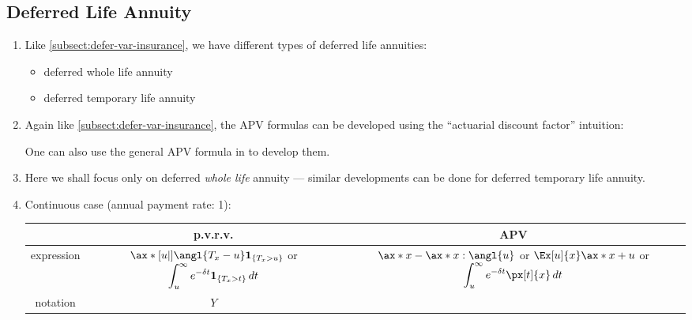 \subsection{Deferred Life Annuity}
\begin{enumerate}
\item Like \cref{subsect:defer-var-insurance}, we have different types of deferred life annuities:
\begin{itemize}
\item deferred whole life annuity
\item deferred temporary life annuity
\end{itemize}
\item Again like \cref{subsect:defer-var-insurance}, the APV formulas can be
developed using the ``actuarial discount factor'' intuition:


One can also use the general APV formula in  to
develop them.
\item Here we shall focus only on deferred \emph{whole life} annuity ---
similar developments can be done for deferred temporary life annuity.
\item \label{it:cts-defer-wl-annuity-fmlas}
Continuous case (annual payment rate: 1):

\begin{tabular}{ccc}
\toprule
&p.v.r.v.&APV \\
\midrule
expression&\(\ax*[u|]{\angl{T_x-u}}\indicset{T_x>u}\) or \(\displaystyle\int_{u}^{\infty}e^{-\delta t}\mathbf{1}_{\left\{T_x>t\right\}}\,dt\)
&\makecell{\(\ax*{x}-\ax*{x:\angl{u}}\) or 
\(\Ex[u]{x}\ax*{x+u}\)\\
or \(\displaystyle\int_{u}^{\infty}e^{-\delta t}\px[t]{x}\,dt\)} \\
notation&\(Y\)&{\(\ax*[u|]{x}\)}\\
\bottomrule
\end{tabular}


\end{enumerate}
